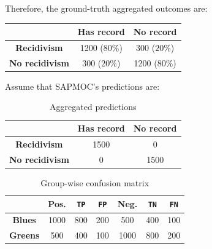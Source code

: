 \begin{example}
\begin{description}
            Therefore, the ground-truth aggregated outcomes are:
            \begin{center}
                \footnotesize
                \begin{tabular}{c|cc}
                    \toprule
                                            & \textbf{Has record} & \textbf{No record} \\
                    \midrule
                    \textbf{Recidivism}     & 1200 ($80\%$) & 300 ($20\%$) \\
                    \textbf{No recidivism}  & 300 ($20\%$) & 1200 ($80\%$) \\
                    \bottomrule
                \end{tabular}
            \end{center}
            
            Assume that SAPMOC's predictions are:\\[-1.5em]
            \begin{minipage}{0.48\linewidth}
                \begin{table}[H]
                    \caption{Aggregated predictions}
                    \footnotesize
                    \begin{tabular}{c|cc}
                        \toprule
                                                & \textbf{Has record} & \textbf{No record} \\
                        \midrule
                        \textbf{Recidivism}     & 1500 & 0 \\
                        \textbf{No recidivism}  & 0 & 1500 \\
                        \bottomrule
                    \end{tabular}
                \end{table}
            \end{minipage}
            \hfill
            \begin{minipage}{0.48\linewidth}
                \begin{table}[H]
                    \caption{Group-wise confusion matrix}
                    \footnotesize
                    \begin{tabular}{c|ccc|ccc}
                        \toprule
                        & \textbf{Pos.} & \texttt{TP} & \texttt{FP} & \textbf{Neg.} & \texttt{TN} & \texttt{FN} \\ 
                        \midrule
                        \textbf{Blues} & 1000 & 800 & 200 & 500 & 400 & 100 \\ 
                        \textbf{Greens} & 500 & 400 & 100 & 1000 & 800 & 200 \\
                        \bottomrule
                    \end{tabular}
                \end{table}
            \end{minipage}


\end{description}
\end{example}
